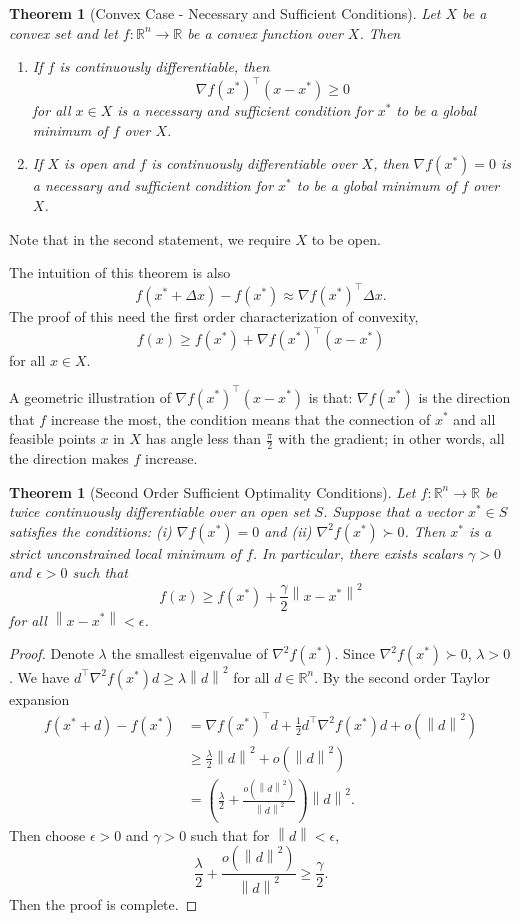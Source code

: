 \documentclass[12pt,a4paper]{article}
\numberwithin{equation}{section}
\theoremstyle{mystyle}
\newtheorem{theorem}[definition]{Theorem}
\newcommand{\R}{\mathbb{R}}
\newcommand{\grad}{\nabla}
\newcommand{\T}{\top}
\newcommand{\norm}[1]{\left\lVert #1 \right\rVert}
\begin{document}
	\begin{theorem}[Convex Case - Necessary and Sufficient Conditions]
		Let $X$ be a convex set and let $f:\R^n \to \R$ be a convex function over $X$. Then
		\begin{enumerate}
			\item If $f$ is continuously differentiable, then
			$$
			\grad f(x^*)^\T(x-x^*)\geq 0
			$$
			for all $x\in X$ is a necessary and sufficient condition for $x^*$ to be a global minimum of $f$ over $X$.
			\item If $X$ is open and $f$ is continuously differentiable over $X$, then $\grad f(x^*)=0$ is a necessary and sufficient condition for $x^*$ to be a global minimum of $f$ over $X$.
		\end{enumerate}
	\end{theorem}
	Note that in the second statement, we require $X$ to be open.

	The intuition of this theorem is also
	$$
	f(x^*+\Delta x)-f(x^*)\approx \grad f(x^*)^\T \Delta x.
	$$
	The proof of this need the first order characterization of convexity,
	$$
	f(x)\geq f(x^*) +\grad f(x^*)^\T (x-x^*)
	$$
	for all $x\in X$.
	
	A geometric illustration of $\grad f(x^*)^\T(x-x^*)$ is that: $\grad f(x^*)$ is the direction that $f$ increase the most, the condition means that the connection of $x^*$ and all feasible points $x$ in $X$ has angle less than $\frac{\pi}{2}$ with the gradient; in other words, all the direction makes $f$ increase.
	
	\begin{theorem}[Second Order Sufficient Optimality Conditions]
		Let $f:\R^n \to \R$ be twice continuously differentiable over an open set $S$. Suppose that a vector $x^*\in S$ satisfies the conditions: (i) $\grad f(x^*)=0$ and (ii) $\grad^2 f(x^*)\succ 0$. Then $x^*$ is a strict unconstrained local minimum of $f$. In particular, there exists scalars $\gamma>0$ and $\epsilon>0$ such that
		$$
		f(x)\geq f(x^*)+\frac{\gamma}{2}\norm{x-x^*}^2
		$$
		for all $\norm{x-x^*}<\epsilon$.
	\end{theorem}
	\begin{proof}
		Denote $\lambda$ the smallest eigenvalue of $\grad^2 f(x^*)$. Since $\grad^2 f(x^*)\succ 0$, $\lambda >0$. We have $d^\T \grad^2 f(x^*)d \geq \lambda \norm{d}^2$ for all $d\in \R^n$. By the second order Taylor expansion
		\begin{align*}
			f(x^*+d)-f(x^*)&=\grad f(x^*)^\T d + \frac{1}{2} d^\T \grad^2 f(x^*)d+o(\norm{d}^2)\\
			&\geq \frac{\lambda}{2}\norm{d}^2+o(\norm{d}^2)\\
			&=\left(\frac{\lambda}{2}+\frac{o(\norm{d}^2)}{\norm{d}^2}\right)\norm{d}^2.
		\end{align*}
		Then choose $\epsilon>0$ and $\gamma>0$ such that for $\norm{d}<\epsilon$,
		$$
		\frac{\lambda}{2}+\frac{o(\norm{d}^2)}{\norm{d}^2}\geq \frac{\gamma}{2}.
		$$
		Then the proof is complete.
	\end{proof}
\end{document}
